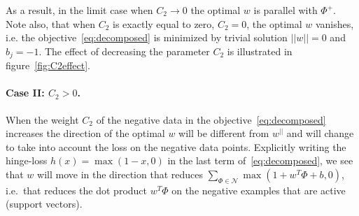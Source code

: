 \documentclass[table]{article} %
\begin{document}
As a result, in the limit case when $C_2 \rightarrow 0$ the optimal $w$ is parallel with $\Phi^+$. 
Note also, that when $C_2$ is exactly equal to zero, $C_2=0$, the optimal $w$ vanishes, i.e. the objective~\eqref{eq:decomposed} is minimized by trivial solution $||w||=0$ and $b_j=-1$. 
The effect of decreasing the parameter $C_2$ is illustrated in figure~\ref{fig:C2effect}.



\paragraph{Case II: $C_2>0$.}

When the weight $C_2$ of the negative data in the objective~\eqref{eq:decomposed} increases
the direction of the optimal $w$ will be different from $w^{||}$ and will change 
 to take into account the loss on the negative data points. Explicitly writing the hinge-loss $h(x) = \max(1-x,0)$ in 
 the last term of~\eqref{eq:decomposed}, we see that $w$ will move in the direction
 that reduces $\sum_{\Phi\in \mathcal N}\max \left(1+w^T \Phi + b ,0 \right)$, i.e.\ that reduces the dot product
 $w^T \Phi$ on the negative examples that are active (support vectors).
 
  

 




\end{document}
